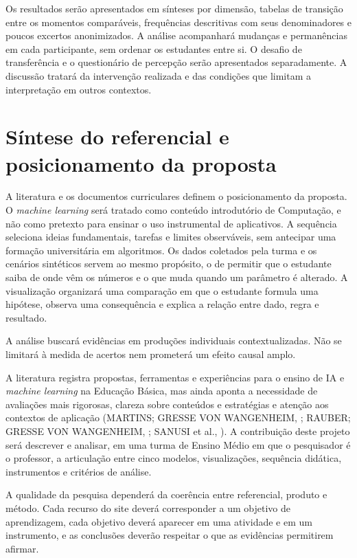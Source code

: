 Os resultados serão apresentados em sínteses por dimensão, tabelas de transição entre os momentos comparáveis, frequências descritivas com seus denominadores e poucos excertos anonimizados. A análise acompanhará mudanças e permanências em cada participante, sem ordenar os estudantes entre si. O desafio de transferência e o questionário de percepção serão apresentados separadamente. A discussão tratará da intervenção realizada e das condições que limitam a interpretação em outros contextos.

\section{Síntese do referencial e posicionamento da proposta}

A literatura e os documentos curriculares definem o posicionamento da proposta. O \textit{machine learning} será tratado como conteúdo introdutório de Computação, e não como pretexto para ensinar o uso instrumental de aplicativos. A sequência seleciona ideias fundamentais, tarefas e limites observáveis, sem antecipar uma formação universitária em algoritmos. Os dados coletados pela turma e os cenários sintéticos servem ao mesmo propósito, o de permitir que o estudante saiba de onde vêm os números e o que muda quando um parâmetro é alterado. A visualização organizará uma comparação em que o estudante formula uma hipótese, observa uma consequência e explica a relação entre dado, regra e resultado.

A análise buscará evidências em produções individuais contextualizadas. Não se limitará à medida de acertos nem prometerá um efeito causal amplo.

A literatura registra propostas, ferramentas e experiências para o ensino de IA e \textit{machine learning} na Educação Básica, mas ainda aponta a necessidade de avaliações mais rigorosas, clareza sobre conteúdos e estratégias e atenção aos contextos de aplicação (\MakeUppercase{MARTINS; GRESSE VON WANGENHEIM}, \citeyear{martins2023findings}; \MakeUppercase{RAUBER; GRESSE VON WANGENHEIM}, \citeyear{rauber2023assessing}; \MakeUppercase{SANUSI} et al., \citeyear{sanusi2023systematic}). A contribuição deste projeto será descrever e analisar, em uma turma de Ensino Médio em que o pesquisador é o professor, a articulação entre cinco modelos, visualizações, sequência didática, instrumentos e critérios de análise.

A qualidade da pesquisa dependerá da coerência entre referencial, produto e método. Cada recurso do site deverá corresponder a um objetivo de aprendizagem, cada objetivo deverá aparecer em uma atividade e em um instrumento, e as conclusões deverão respeitar o que as evidências permitirem afirmar.
